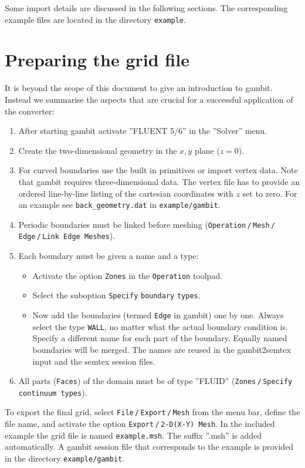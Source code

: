 \documentclass{article}
\begin{document}
Some import details are discussed in the following sections. The corresponding 
example files are located in the directory \verb|example|.


\section{Preparing the grid file}

It is beyond the scope of this document to give an introduction to gambit. Instead we summarise the aspects that are crucial for a successful application
of the converter:
\begin{enumerate}
\item After starting gambit activate ''FLUENT 5/6'' in the ''Solver'' menu. 
\item Create the two-dimensional geometry in the $x,y$ plane ($z=0$).
\item For curved boundaries use the built in primitives or import vertex
data. Note that gambit requires three-dimensional data. The vertex 
file has to provide an ordered line-by-line listing of the cartesian
coordinates with $z$ set to zero.
For an example see \verb|back_geometry.dat| in \verb|example/gambit|.
\item Periodic boundaries must be linked before meshing 
(\verb|Operation|\,\verb|/|\,\verb|Mesh|\,\verb|/|\,\verb|Edge|\,\verb|/|\,\verb|Link Edge Meshes|).
\item Each boundary must be given a name and a type:
   \begin{itemize}
    \item Activate the option \verb|Zones| in the \verb|Operation| toolpad.
    \item Select the suboption \verb|Specify| \verb|boundary| \verb|types|.
    \item Now add the boundaries (termed \verb|Edge| in gambit) one by 
          one. Always select the type \verb|WALL|, no matter what the actual 
          boundary condition is. Specify a different name for each part
          of the boundary. Equally named boundaries will be merged. 
          The names are reused in the gambit2semtex input and the 
          semtex session files. 
   \end{itemize}
\item All parts (\verb|Faces|) of the domain must be of type ''FLUID''
 (\verb|Zones|\,\verb|/|\,\verb|Specify continuum types|).
\end{enumerate}
To export the final grid, select 
\verb|File|\,\verb|/|\,\verb|Export|\,\verb|/|\,\verb|Mesh|
from the menu bar, define the file name, and
activate the option \verb|Export|\,\verb|/|\,\verb|2-D(X-Y) Mesh|. 
In the included example the grid file is named \verb|example.msh|.
The suffix ''.msh'' is added automatically.
A gambit session file that corresponds to the example is provided
in the directory \verb|example/gambit|.
\end{document}
